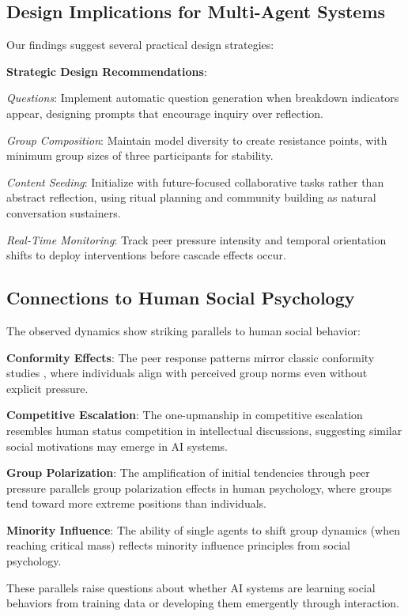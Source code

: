 \documentclass[11pt,letterpaper]{article}
\begin{document}
\subsection{Design Implications for Multi-Agent Systems}

Our findings suggest several practical design strategies:

\textbf{Strategic Design Recommendations}:

\textit{Questions}: Implement automatic question generation when breakdown indicators appear, designing prompts that encourage inquiry over reflection.

\textit{Group Composition}: Maintain model diversity to create resistance points, with minimum group sizes of three participants for stability.

\textit{Content Seeding}: Initialize with future-focused collaborative tasks rather than abstract reflection, using ritual planning and community building as natural conversation sustainers.

\textit{Real-Time Monitoring}: Track peer pressure intensity and temporal orientation shifts to deploy interventions before cascade effects occur.

\subsection{Connections to Human Social Psychology}

The observed dynamics show striking parallels to human social behavior:

\textbf{Conformity Effects}: The peer response patterns mirror classic conformity studies \citep{asch1956studies}, where individuals align with perceived group norms even without explicit pressure.

\textbf{Competitive Escalation}: The one-upmanship in competitive escalation resembles human status competition in intellectual discussions, suggesting similar social motivations may emerge in AI systems.

\textbf{Group Polarization}: The amplification of initial tendencies through peer pressure parallels group polarization effects in human psychology, where groups tend toward more extreme positions than individuals.

\textbf{Minority Influence}: The ability of single agents to shift group dynamics (when reaching critical mass) reflects minority influence principles from social psychology.

These parallels raise questions about whether AI systems are learning social behaviors from training data or developing them emergently through interaction.
\end{document}
